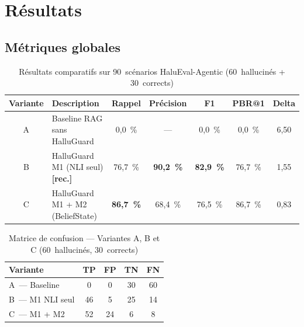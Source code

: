\documentclass[12pt,a4paper]{article}
\begin{document}
\section{Résultats}

\subsection{Métriques globales}

\begin{table}[H]
\centering
\caption{Résultats comparatifs sur 90~scénarios HaluEval-Agentic (60~hallucinés + 30~corrects)}
\label{tab:results_global}
\renewcommand{\arraystretch}{1.25}
\begin{tabular}{clccccc}
\toprule
\textbf{Variante} & \textbf{Description} & \textbf{Rappel} & \textbf{Précision} & \textbf{F1} & \textbf{PBR@1} & \textbf{Delta} \\
\midrule
\rowcolor{rowgray}
A  & Baseline RAG sans HalluGuard              & 0,0~\%  & ---               & 0,0~\%              & 0,0~\%  & 6,50 \\
\rowcolor{highlight}
B  & HalluGuard M1 (NLI seul) \textbf{[rec.]} & 76,7~\% & \textbf{90,2~\%} & \textbf{82,9~\%} & 76,7~\% & 1,55 \\
C & HalluGuard M1 + M2 (BeliefState) & \textbf{86,7~\%} & 68,4~\% & 76,5~\% & 86,7~\% & 0,83 \\
\bottomrule
\end{tabular}
\end{table}

\begin{table}[H]
\centering
\caption{Matrice de confusion --- Variantes A, B et C (60~hallucinés, 30~corrects)}
\label{tab:confusion}
\renewcommand{\arraystretch}{1.2}
\begin{tabular}{lcccc}
\toprule
\textbf{Variante} & \textbf{TP} & \textbf{FP} & \textbf{TN} & \textbf{FN} \\
\midrule
A~--- Baseline       &  0 &  0 & 30 & 60 \\
B~--- M1 NLI seul    & 46 &  5 & 25 & 14 \\
C~--- M1 + M2        & 52 & 24 &  6 &  8 \\
\bottomrule
\end{tabular}
\end{table}
\end{document}
